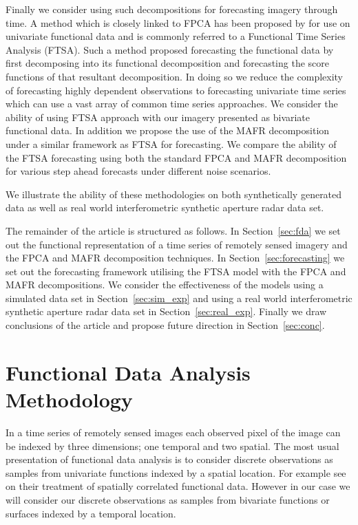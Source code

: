 \documentclass{article}
\begin{document}
Finally we consider using such decompositions for forecasting imagery through time. A method which is closely linked to FPCA has been proposed by \citet{shang_ftsa_2013} for use on univariate functional data and is commonly referred to a Functional Time Series Analysis (FTSA). Such a method proposed forecasting the functional data by first decomposing into its functional decomposition and forecasting the score functions of that resultant decomposition. In doing so we reduce the complexity of forecasting highly dependent observations to forecasting univariate time series which can use a vast array of common time series approaches. We consider the ability of using FTSA approach with our imagery presented as bivariate functional data. In addition we propose the use of the MAFR decomposition under a similar framework as FTSA for forecasting.  We compare the ability of the FTSA forecasting using both the standard FPCA and MAFR decomposition for various step ahead forecasts under different noise scenarios. 

We illustrate the ability of these methodologies on both synthetically generated data as well as real world interferometric synthetic aperture radar data set. 

The remainder of the article is structured as follows. In Section~\ref{sec:fda} we set out the functional representation of a time series of remotely sensed imagery and the FPCA and MAFR decomposition techniques. In Section~\ref{sec:forecasting} we set out the forecasting framework utilising the FTSA model with the FPCA and MAFR decompositions. We consider the effectiveness of the models using a simulated data set in Section~\ref{sec:sim_exp} and using a real world interferometric synthetic aperture radar data set in Section~\ref{sec:real_exp}. Finally we draw conclusions of the article and propose future direction in Section~\ref{sec:conc}. 

\section{\label{sec:fda}Functional Data Analysis Methodology}
In a time series of remotely sensed images each observed pixel of the image can be indexed by three dimensions; one temporal and two spatial. The most usual presentation of functional data analysis is to consider discrete observations as samples from univariate functions indexed by a spatial location. For example see \citet{liu_functional_2017} on their treatment of spatially correlated functional data. However in our case we will consider our discrete observations as samples from bivariate functions or surfaces indexed by a temporal location.
\end{document}

